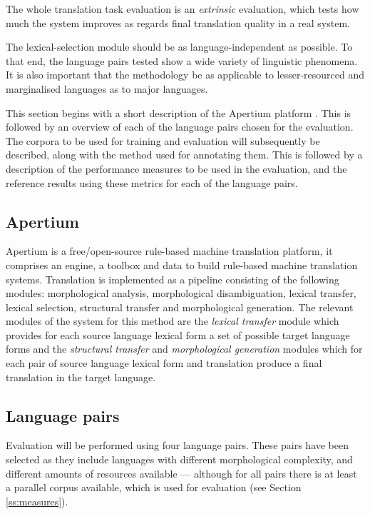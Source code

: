 \documentclass[11pt]{article}
\begin{document}
The
whole translation task evaluation is an \emph{extrinsic} evaluation, which
tests how much the system improves as regards final translation
quality in a real system.

The lexical-selection module should be as language-independent as
possible. To that end, the language pairs tested show a wide
variety of linguistic phenomena. It is also important that the
methodology be as applicable to lesser-resourced and marginalised
languages as to major languages.

This section begins with a short description of the Apertium 
platform \citep{forcada2011apertium}. This is followed by 
an overview of each of the language
pairs chosen for the evaluation. The corpora to be used for training
and evaluation will subsequently be described, along with the method
used for annotating them. This is followed by a description of the
performance measures to be used in the evaluation, and the reference
results using these metrics for each of the language pairs.

\subsection{Apertium}
\label{sec:apertium}

Apertium is a free/open-source rule-based machine translation platform, 
it comprises an engine, a toolbox and data to build rule-based machine
translation systems. Translation is implemented as a pipeline consisting
of the following modules: morphological analysis, morphological disambiguation,
lexical transfer, lexical selection, structural transfer and morphological
generation. The relevant   modules of the system for this method are the \emph{lexical transfer}
module which provides for each source language lexical form a set of possible
target language forms and the \emph{structural transfer} and \emph{morphological generation}
modules which for each pair of source language lexical form and translation 
produce a final translation in the target language. 

\subsection{Language pairs}
\label{sec:eval-systems}

Evaluation will be performed using four language pairs. These pairs
have been selected as they include languages with different
morphological complexity, and different amounts of resources available
--- although for all pairs there is at least  a parallel corpus available, which
is used for evaluation (see Section \ref{ss:measures}). 
\end{document}
